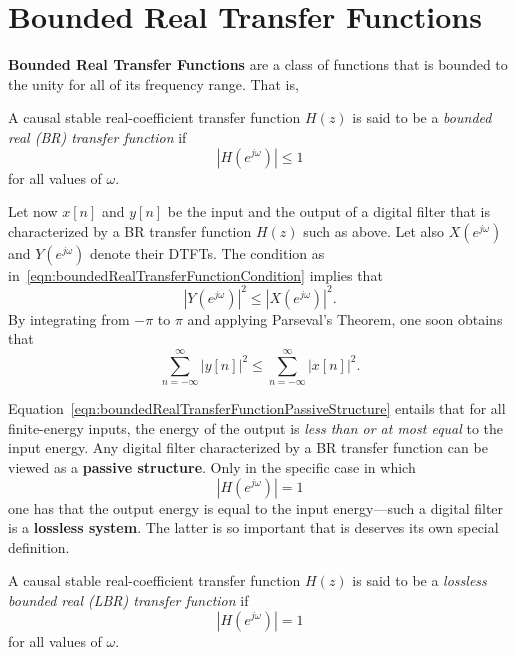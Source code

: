 \documentclass[\documentfontsize, twocolumn]{\classname}
\begin{document}
\section{Bounded Real Transfer Functions}

\textbf{Bounded Real Transfer Functions} are a class of functions that is bounded to the unity for all of its frequency range. That is,
\begin{defin}
    A causal stable real-coefficient transfer function $H(z)$ is said to be a \emph{bounded real (BR) transfer function} if
    \begin{equation}\label{eqn:boundedRealTransferFunctionCondition}
        \left|H(e^{j\omega})\right| \leq 1
    \end{equation}
    for all values of $\omega$.
\end{defin}

Let now $x[n]$ and $y[n]$ be the input and the output of a digital filter that is characterized by a BR transfer function $H(z)$ such as above. Let also $X(e^{j\omega})$ and $Y(e^{j\omega})$ denote their DTFTs. The condition as in~\ref{eqn:boundedRealTransferFunctionCondition} implies that 
\[
    \left|Y(e^{j\omega})\right|^2 \leq \left|X(e^{j\omega})\right|^2.
\]
By integrating from $-\pi$ to $\pi$ and applying Parseval's Theorem, one soon obtains that
\begin{equation}\label{eqn:boundedRealTransferFunctionPassiveStructure}
    \sum_{n=-\infty}^\infty\left|y[n]\right|^2 \leq \sum_{n=-\infty}^\infty\left|x[n]\right|^2.
\end{equation}

Equation~\ref{eqn:boundedRealTransferFunctionPassiveStructure} entails that for all finite-energy inputs, the energy of the output is \emph{less than or at most equal} to the input energy. Any digital filter characterized by a BR transfer function can be viewed as a \textbf{passive structure}. Only in the specific case in which
\[
    \left|H(e^{j\omega})\right| = 1
\]
one has that the output energy is equal to the input energy---such a digital filter is a \textbf{lossless system}. The latter is so important that is deserves its own special definition.

\begin{defin}
    A causal stable real-coefficient transfer function $H(z)$ is said to be a \emph{lossless bounded real (LBR) transfer function} if
    \begin{equation}\label{eqn:losslessBoundedRealTransferFunctionCondition}
        \left|H(e^{j\omega})\right| = 1
    \end{equation}
    for all values of $\omega$.
\end{defin}
\end{document}
